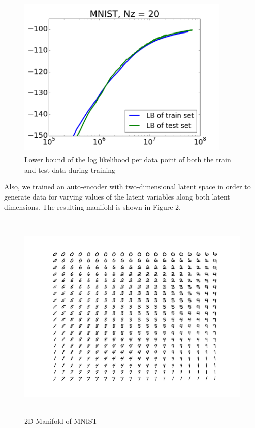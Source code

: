 \documentclass{article}
\begin{document}
\begin{figure}[htb]
\begin{center}
\includegraphics[height=3.1in,width=4in]{lowerboundAEVBMNIST.png}
\caption{Lower bound of the log likelihood per data point of both the train and test data during training}
\end{center}
\end{figure}

Also, we trained an auto-encoder with two-dimensional latent space in order to generate data for varying values of the latent variables along both latent dimensions. The resulting manifold is shown in Figure 2.

\begin{figure}[htb]
\begin{center}
\includegraphics[height=4in,width=5in]{manifoldMNIST.png}
\caption{2D Manifold of MNIST}
\end{center}
\end{figure}
\end{document}

